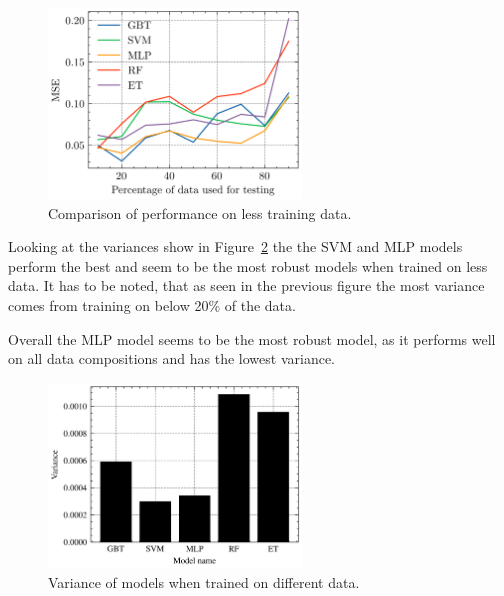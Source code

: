 \begin{figure}[h]
    \begin{tcolorbox}[arc=0pt,boxrule=0.5pt]
        \centering
        \includegraphics[width=0.6\textwidth]{chap5/images/missing_values_plot}
    \end{tcolorbox}
    \caption{Comparison of performance on less training data.}
    \label{fig:results-missing-values}
\end{figure}

Looking at the variances show in Figure~\ref{fig:variance-missing-values} the the \ac{SVM} and \ac{MLP} models
perform the best and seem to be the most robust models when trained on less data.
It has to be noted, that as seen in the previous figure the most variance comes from training on
below 20\% of the data.

Overall the \ac{MLP} model seems to be the most robust model, as it performs well on all data
compositions and has the lowest variance.

\begin{figure}[h]
    \begin{tcolorbox}[arc=0pt,boxrule=0.5pt]
        \centering
        \includegraphics[width=0.6\textwidth]{chap5/images/variance_missing_values}
    \end{tcolorbox}
    \caption{Variance of models when trained on different data.}
    \label{fig:variance-missing-values}
\end{figure}


